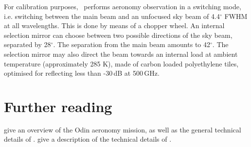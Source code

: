 For calibration purposes, \smr\ performs aeronomy observation
in a switching mode, i.e. switching between the main beam and
an unfocused sky beam of 4.4$^{\circ}$ FWHM at all wavelengths. This is done
by means of a chopper wheel. An internal selection mirror
can choose between two possible directions of the sky beam,
separated by 28$^{\circ}$. The separation from the main beam
amounts to 42$^{\circ}$.
The selection mirror may also direct the beam towards an internal
load at ambient temperature (approximately 285 K), made of carbon 
loaded polyethylene tiles, optimised for reflecting less than -30\,dB at 500\,GHz.



\section{Further reading}
\label{sec:reading}

\citet{murtagh:anove:02} give an overview of the Odin aeronomy mission, as well
as the general technical details of \smr. \citet{frisk:theod:03} give a description
of the technical details of \smr.


